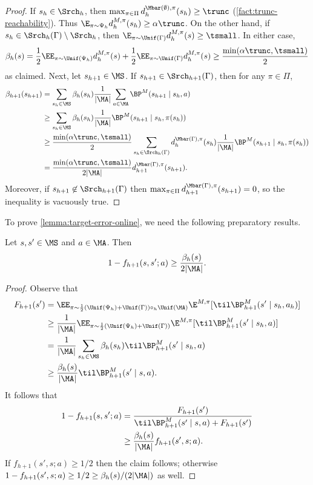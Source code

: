 \begin{proof}
If $s_h \in \Srch_h$, then $\max_{\pi\in\Pi} d^{\Mbar(\emptyset),\pi}_h(s_h) \geq \trunc$ (\cref{fact:trunc-reachability}). Thus $\E_{\pi\sim\Psi_h} d^{M,\pi}_h(s_h) \geq \alpha\trunc$. On the other hand, if $s_h \in \Srch_h(\Gamma)\setminus\Srch_h$, then $\E_{\pi\sim\Unif(\Gamma)} d^{M,\pi}_h(s) \geq \tsmall$. In either case,
\[\beta_h(s) = \frac{1}{2}\EE_{\pi\sim\Unif(\Psi_h)} d^{M,\pi}_h(s) + \frac{1}{2}\EE_{\pi\sim\Unif(\Gamma)} d^{M,\pi}_h(s) \geq \frac{\min(\alpha\trunc,\tsmall)}{2}\]
as claimed. Next, let $s_{h+1} \in \MS$. If $s_{h+1} \in \Srch_{h+1}(\Gamma)$, then for any $\pi \in \Pi$,
\begin{align*}
\beta_{h+1}(s_{h+1})
&= \sum_{s_h \in \MS} \beta_h(s_h) \frac{1}{|\MA|}\sum_{a \in \MA} \BP^M(s_{h+1}\mid{}s_h,a) \\ 
&\geq \sum_{s_h \in \MS} \beta_h(s_h) \frac{1}{|\MA|} \BP^M(s_{h+1}\mid{}s_h,\pi(s_h)) \\
&\geq \frac{\min(\alpha\trunc,\tsmall)}{2}\sum_{s_h\in\Srch_h(\Gamma)} d^{\Mbar(\Gamma),\pi}_h(s_h) \frac{1}{|\MA|} \BP^M(s_{h+1}\mid{}s_h,\pi(s_h)) \\
&= \frac{\min(\alpha\trunc,\tsmall)}{2|\MA|} d^{\Mbar(\Gamma),\pi}_{h+1}(s_{h+1}).
\end{align*}
Moreover, if $s_{h+1} \not \in \Srch_{h+1}(\Gamma)$ then $\max_{\pi\in\Pi} d^{\Mbar(\Gamma),\pi}_{h+1}(s_{h+1}) = 0$, so the inequality is vacuously true.
\end{proof}
\fi

\noindent To prove \cref{lemma:target-error-online}, we need the following preparatory results.

\begin{lemma}\label{lemma:f-ub}
Let $s,s' \in \MS$ and $a \in \MA$. Then 
\[1-f_{h+1}(s,s';a) \geq \frac{\beta_h(s)}{2|\MA|}.\]
\end{lemma}

\begin{proof}
Observe that
\begin{align*}
F_{h+1}(s')
&= \EE_{\pi \sim \frac{1}{2}(\Unif(\Psi_h)+\Unif(\Gamma))\circ_h\Unif(\MA)} \E^{M,\pi}[\til\BP^M_{h+1}(s'\mid{}s_h,a_h)] \\
&\geq \frac{1}{|\MA|} \EE_{\pi \sim \frac{1}{2}(\Unif(\Psi_h)+\Unif(\Gamma))} \E^{M,\pi}[\til\BP^M_{h+1}(s'\mid{}s_h,a)] \\ 
&= \frac{1}{|\MA|} \sum_{s_h \in \MS} \beta_h(s_h) \til\BP^M_{h+1}(s'\mid{}s_h,a) \\ 
&\geq \frac{\beta_h(s)}{|\MA|} \til\BP^M_{h+1}(s'\mid{}s,a).
\end{align*}
It follows that
\begin{align*}
1 - f_{h+1}(s,s';a)
&= \frac{F_{h+1}(s')}{\til\BP^M_{h+1}(s'\mid{}s,a) + F_{h+1}(s')} \\ 
&\geq \frac{\beta_h(s)}{|\MA|} f_{h+1}(s',s;a).
\end{align*}
If $f_{h+1}(s',s;a) \geq 1/2$ then the claim follows; otherwise $1-f_{h+1}(s',s;a) \geq 1/2 \geq \beta_h(s)/(2|\MA|)$ as well.
\end{proof}

